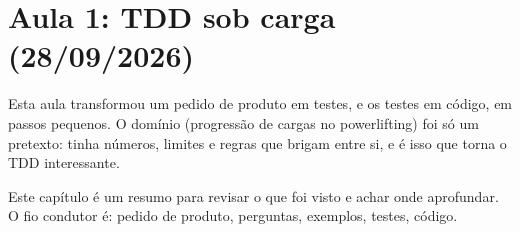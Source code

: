 \chapter{Aula 1: TDD sob carga (28/09/2026)}
\label{cap:aula1}

Esta aula transformou um pedido de produto em testes, e os testes em
código, em passos pequenos. O domínio (progressão de cargas no
powerlifting) foi só um pretexto: tinha números, limites e regras que
brigam entre si, e é isso que torna o TDD interessante.

Este capítulo é um resumo para revisar o que foi visto e achar onde
aprofundar. O fio condutor é: pedido de produto, perguntas, exemplos,
testes, código.








